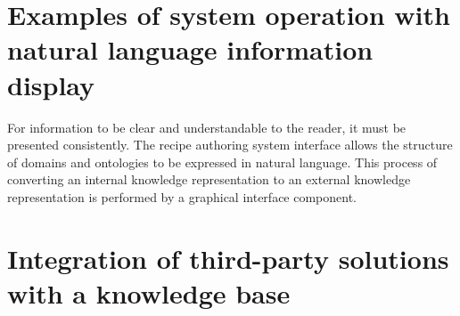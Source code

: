 

\section{Examples of system operation with natural language information display}

For information to be clear and understandable to the reader, it must be
presented consistently. The recipe authoring system interface allows the
structure of domains and ontologies to be expressed in natural language. This
process of converting an internal knowledge representation to an external
knowledge representation is performed by a graphical interface component.

\section{Integration of third-party solutions with a knowledge base}

